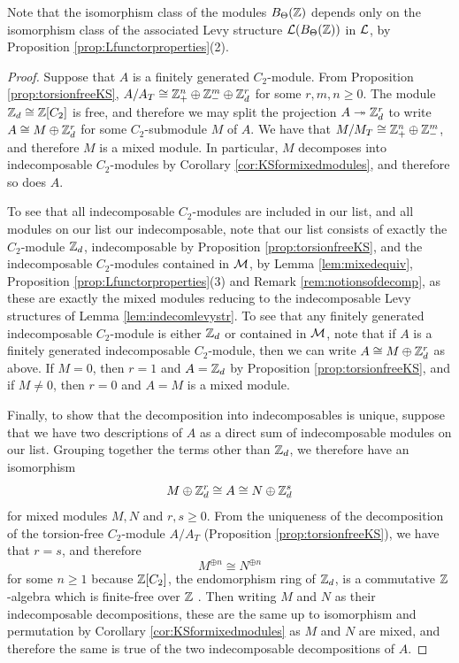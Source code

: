 \begin{remark}
  Note that the isomorphism class of the modules $B_\Theta({\mathbb Z})$ depends only on the isomorphism class of the associated Levy structure ${\mathcal L}(B_\Theta({\mathbb Z}))$ in ${\mathcal L}$, by Proposition \ref{prop:Lfunctorproperties}(2).
\end{remark}

\begin{proof}
  Suppose that $A$ is a finitely generated $C_2$-module. From Proposition \ref{prop:torsionfreeKS}, $A/A_T \cong {\mathbb Z}_+^n \oplus {\mathbb Z}_-^m \oplus {\mathbb Z}_d^r$ for some $r,m,n \geq 0$. The module ${\mathbb Z}_d \cong {\mathbb Z}[C_2]$ is free, and therefore we may split the projection $A \twoheadrightarrow {\mathbb Z}_d^r$ to write $A \cong M \oplus {\mathbb Z}_d^r$ for some $C_2$-submodule $M$ of $A$. We have that $M / M_T \cong {\mathbb Z}_+^n \oplus {\mathbb Z}_-^m$, and therefore $M$ is a mixed module. In particular, $M$ decomposes into indecomposable $C_2$-modules by Corollary \ref{cor:KSformixedmodules}, and therefore so does $A$. 

  To see that all indecomposable $C_2$-modules are included in our list, and all modules on our list our indecomposable, note that our list consists of exactly the $C_2$-module ${\mathbb Z}_d$, indecomposable by Proposition \ref{prop:torsionfreeKS}, and the indecomposable $C_2$-modules contained in ${\mathcal M}$, by Lemma \ref{lem:mixedequiv}, Proposition \ref{prop:Lfunctorproperties}(3) and Remark \ref{rem:notionsofdecomp}, as these are exactly the mixed modules reducing to the indecomposable Levy structures of Lemma \ref{lem:indecomlevystr}. To see that any finitely generated indecomposable $C_2$-module is either ${\mathbb Z}_d$ or contained in ${\mathcal M}$, note that if $A$ is a finitely generated indecomposable $C_2$-module, then we can write $A \cong M \oplus {\mathbb Z}_d^r$ as above. If $M = 0$, then $r = 1$ and $A = {\mathbb Z}_d$ by Proposition \ref{prop:torsionfreeKS}, and if $M \neq 0$, then $r = 0$ and $A = M$ is a mixed module.

  Finally, to show that the decomposition into indecomposables is unique, suppose that we have two descriptions of $A$ as a direct sum of indecomposable modules on our list. Grouping together the terms other than ${\mathbb Z}_d$, we therefore have an isomorphism
  \[
    M \oplus {\mathbb Z}_d^r \cong A \cong N \oplus {\mathbb Z}_d^s
  \]
for mixed modules $M,N$ and $r,s \geq 0$. From the uniqueness of the decomposition of the torsion-free $C_2$-module $A / A_T$ (Proposition \ref{prop:torsionfreeKS}), we have that $r = s$, and therefore
\[
M^{\oplus n} \cong N^{\oplus n}
\]
for some $n \geq 1$ because ${\mathbb Z}[C_2]$, the endomorphism ring of ${\mathbb Z}_d$, is a commutative ${\mathbb Z}$-algebra which is finite-free over ${\mathbb Z}$ \cite[Cor.\ 2.2, Thm.\ 3.10]{GOO}. Then writing $M$ and $N$ as their indecomposable decompositions, these are the same up to isomorphism and permutation by Corollary \ref{cor:KSformixedmodules} as $M$ and $N$ are mixed, and therefore the same is true of the two indecomposable decompositions of $A$.
\end{proof}


